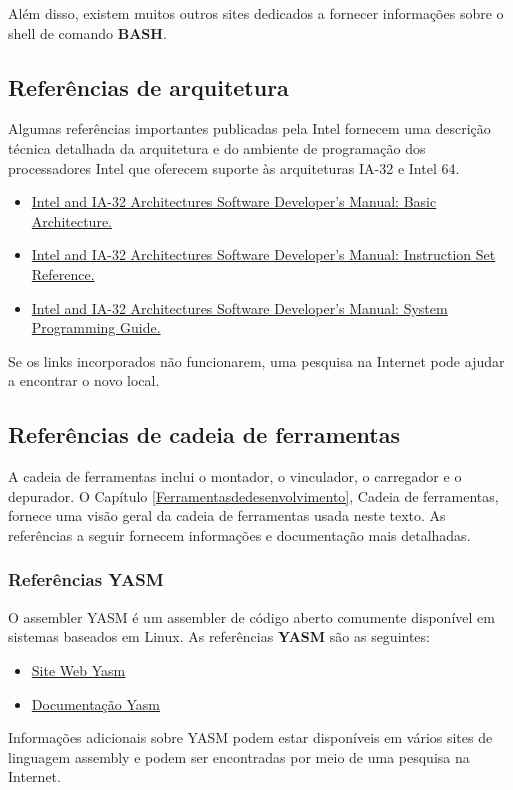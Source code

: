 Além disso, existem muitos outros sites dedicados a fornecer informações sobre o shell de comando \textbf{BASH}.

\subsection{Referências de arquitetura}
Algumas referências importantes publicadas pela Intel fornecem uma descrição técnica detalhada da arquitetura e do ambiente de programação dos processadores Intel que oferecem suporte às arquiteturas IA-32 e Intel 64.
\begin{itemize}
	\item \href{https://www.intel.com/content/dam/www/public/us/en/documents/manuals/64-ia-32-architectures-software-developer-vol-1-manual.pdf}{Intel\textregistered{} and IA-32 Architectures	Software Developer’s Manual: Basic
		Architecture.}
	\item \href{http://www.intel.com/content/dam/www/public/us/en/documents/manuals/64-ia-32-architectures-software-developer-instruction-set-reference-manual-325383.pdf}{Intel\textregistered{} and IA-32 Architectures Software Developer’s Manual: Instruction
		Set Reference.}
	\item  \href{https://www.intel.com/content/dam/www/public/us/en/documents/manuals/64-ia-32-architectures-software-developer-system-programming-manual-325384.pdf}{Intel\textregistered{} and IA-32 Architectures Software Developer’s Manual: System
		Programming Guide.}
\end{itemize}

Se os links incorporados não funcionarem, uma pesquisa na Internet pode ajudar a encontrar o novo local.

\subsection{Referências de cadeia de ferramentas}
A cadeia de ferramentas inclui o montador, o vinculador, o carregador e o depurador. O Capítulo \ref*{Ferramentasdedesenvolvimento}, Cadeia de ferramentas, fornece uma visão geral da cadeia de ferramentas usada neste texto. As referências a seguir fornecem informações e documentação mais detalhadas.

\subsubsection{Referências YASM}
O assembler YASM é um assembler de código aberto comumente disponível em sistemas baseados em Linux. As referências \textbf{YASM} são as seguintes:
\begin{itemize}
	\item \href{http://yasm.tortall.net/}{Site Web Yasm}
	\item \href{http://yasm.tortall.net/Guide.html}{Documentação Yasm}
\end{itemize}
Informações adicionais sobre YASM podem estar disponíveis em vários sites de linguagem assembly e podem ser encontradas por meio de uma pesquisa na Internet.

